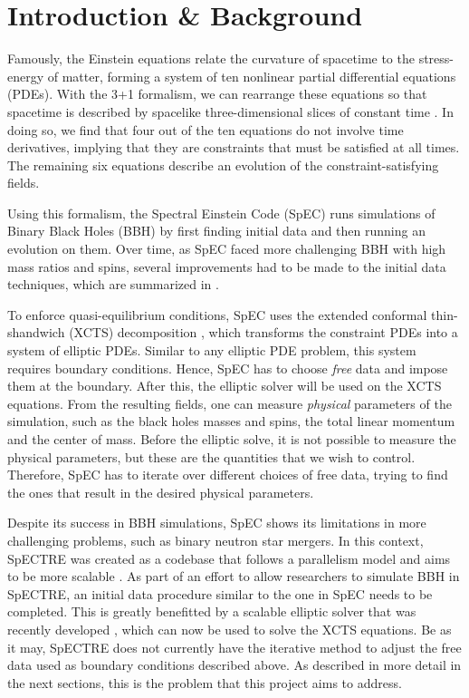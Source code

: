 \documentclass{../letter}
\begin{document}

	\section{Introduction \& Background}

	Famously, the Einstein equations relate the curvature of spacetime to the stress-energy of matter, forming a system of ten nonlinear partial differential equations (PDEs). With the 3+1 formalism, we can rearrange these equations so that spacetime is described by spacelike three-dimensional slices of constant time \cite{Alcubierre}. In doing so, we find that four out of the ten equations do not involve time derivatives, implying that they are constraints that must be satisfied at all times. The remaining six equations describe an evolution of the constraint-satisfying fields.

	Using this formalism, the Spectral Einstein Code (SpEC) \cite{SpEC} runs simulations of Binary Black Holes (BBH) by first finding initial data and then running an evolution on them. Over time, as SpEC faced more challenging BBH with high mass ratios and spins, several improvements had to be made to the initial data techniques, which are summarized in \cite{Serguei}.
	
	To enforce quasi-equilibrium conditions, SpEC uses the extended conformal thin-shandwich (XCTS) decomposition \cite{Serguei}, which transforms the constraint PDEs into a system of elliptic PDEs. Similar to any elliptic PDE problem, this system requires boundary conditions. Hence, SpEC has to choose \textit{free} data and impose them at the boundary. After this, the elliptic solver will be used on the XCTS equations. From the resulting fields, one can measure \textit{physical} parameters of the simulation, such as the black holes masses and spins, the total linear momentum and the center of mass. Before the elliptic solve, it is not possible to measure the physical parameters, but these are the quantities that we wish to control. Therefore, SpEC has to iterate over different choices of free data, trying to find the ones that result in the desired physical parameters.
	
	Despite its success in BBH simulations, SpEC shows its limitations in more challenging problems, such as binary neutron star mergers. In this context, SpECTRE \cite{SpECTRE} was created as a codebase that follows a parallelism model and aims to be more scalable \cite{Kidder}. As part of an effort to allow researchers to simulate BBH in SpECTRE, an initial data procedure similar to the one in SpEC needs to be completed. This is greatly benefitted by a scalable elliptic solver that was recently developed \cite{Vu}, which can now be used to solve the XCTS equations. Be as it may, SpECTRE does not currently have the iterative method to adjust the free data used as boundary conditions described above. As described in more detail in the next sections, this is the problem that this project aims to address.
\end{document}
